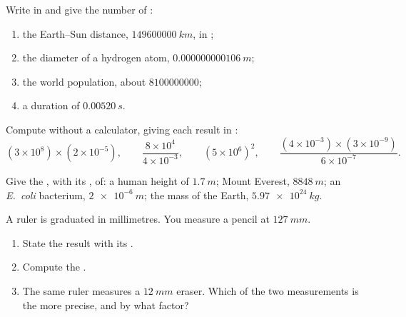 \begin{exercise}[$\star$]\label{exo:g10:orders-of-magnitude:2}
Write in  and give the number of :
\begin{enumerate}
  \item the Earth--Sun distance, $\qty{149600000}{km}$, in ;
  \item the diameter of a hydrogen atom, $\qty{0.000000000106}{m}$;
  \item the world population, about $\num{8100000000}$;
  \item a duration of $\qty{0.00520}{s}$.
\end{enumerate}
\end{exercise}

\begin{exercise}[$\star$]\label{exo:g10:orders-of-magnitude:3}
Compute without a calculator, giving each result in :
\[
(3\times10^{8})\times(2\times10^{-5}), \qquad
\frac{8\times10^{4}}{4\times10^{-3}}, \qquad
(5\times10^{6})^{2}, \qquad
\frac{(4\times10^{-3})\times(3\times10^{-9})}{6\times10^{-7}} .
\]
\end{exercise}

\begin{exercise}[$\star$]\label{exo:g10:orders-of-magnitude:4}
Give the , with its , of: a human height of
$\qty{1.7}{m}$; Mount Everest, $\qty{8848}{m}$; an \emph{E.~coli}
bacterium, $\qty{2e-6}{m}$; the mass of the Earth,
$\qty{5.97e24}{kg}$.
\end{exercise}

\begin{exercise}[$\star$]\label{exo:g10:orders-of-magnitude:5}
A ruler is graduated in millimetres. You measure a pencil at
$\qty{127}{mm}$.
\begin{enumerate}
  \item State the result with its .
  \item Compute the .
  \item The same ruler measures a $\qty{12}{mm}$ eraser. Which of the
        two measurements is the more precise, and by what factor?
\end{enumerate}
\end{exercise}

